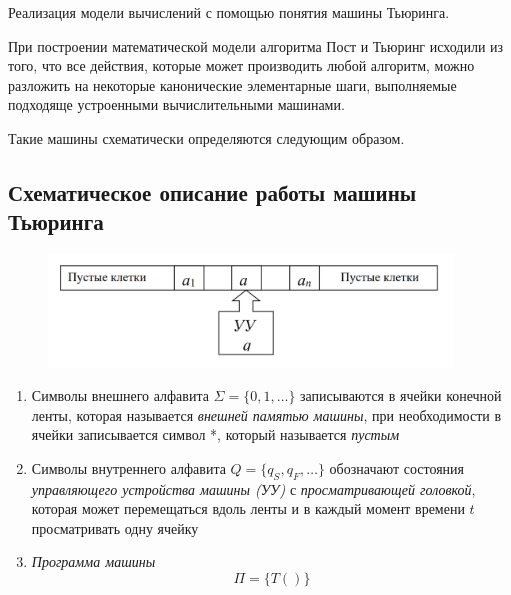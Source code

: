 Реализация модели вычислений с помощью понятия машины Тьюринга.

При построении математической модели алгоритма Пост и 
Тьюринг исходили из того, что все действия, которые может 
производить любой алгоритм, можно разложить на некоторые 
канонические элементарные шаги, выполняемые подходяще 
устроенными вычислительными машинами. 

Такие машины схематически определяются следующим образом.

\subsection*{Схематическое описание работы машины Тьюринга}
\begin{figure}[H]
    \centering
    \includegraphics[height = 3cm]{images/machine.png}
\end{figure}

\begin{enumerate}
    \item Символы внешнего алфавита $\Sigma=\{0,1,\ldots\}$ записываются в ячейки конечной ленты, которая называется \textit{внешней памятью машины}, при необходимости в ячейки записывается символ *, который называется \textit{пустым}
    \item Символы внутреннего алфавита $Q = \{q_S,q_F,\ldots\}$ обозначают состояния \textit{управляющего устройства машины (УУ)} с \textit{просматривающей головкой}, которая может перемещаться вдоль ленты и в каждый момент времени $t$ просматривать одну ячейку
    \item \textit{Программа машины}
    $$\Pi = \{T()\}$$
\end{enumerate}
